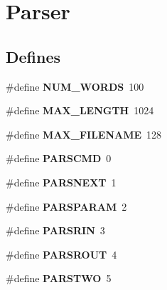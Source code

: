 \hypertarget{group__Parser}{
\section{Parser}
\label{group__Parser}
}
\subsection*{Defines}
\begin{DoxyCompactItemize}
\item 
\hypertarget{group__Parser_ga2d0895da0d518a9553f025d8f472dca7}{
\#define {\bfseries NUM\_\-WORDS}~100}
\label{group__Parser_ga2d0895da0d518a9553f025d8f472dca7}

\item 
\hypertarget{group__Parser_ga7a9a231e30b47bc0345749c8bd1e5077}{
\#define {\bfseries MAX\_\-LENGTH}~1024}
\label{group__Parser_ga7a9a231e30b47bc0345749c8bd1e5077}

\item 
\hypertarget{group__Parser_gabe0ec333b60117063f9b9fd9f849cb08}{
\#define {\bfseries MAX\_\-FILENAME}~128}
\label{group__Parser_gabe0ec333b60117063f9b9fd9f849cb08}

\item 
\hypertarget{group__Parser_ga7ff1d37ba596d0bc0c8319538cfb0efc}{
\#define {\bfseries PARSCMD}~0}
\label{group__Parser_ga7ff1d37ba596d0bc0c8319538cfb0efc}

\item 
\hypertarget{group__Parser_ga348a4301f90e359ef6d45a385eccd1d2}{
\#define {\bfseries PARSNEXT}~1}
\label{group__Parser_ga348a4301f90e359ef6d45a385eccd1d2}

\item 
\hypertarget{group__Parser_ga213b75a82e911dd5125ce5ea7c208789}{
\#define {\bfseries PARSPARAM}~2}
\label{group__Parser_ga213b75a82e911dd5125ce5ea7c208789}

\item 
\hypertarget{group__Parser_gad8a36cf6b47f8549b1e9ead51fbc817d}{
\#define {\bfseries PARSRIN}~3}
\label{group__Parser_gad8a36cf6b47f8549b1e9ead51fbc817d}

\item 
\hypertarget{group__Parser_ga5bb92f0a228c5794f4d0f3346794aa75}{
\#define {\bfseries PARSROUT}~4}
\label{group__Parser_ga5bb92f0a228c5794f4d0f3346794aa75}

\item 
\hypertarget{group__Parser_ga584499b224735da2a07d1c5199614624}{
\#define {\bfseries PARSTWO}~5}
\label{group__Parser_ga584499b224735da2a07d1c5199614624}


\end{DoxyCompactItemize}
